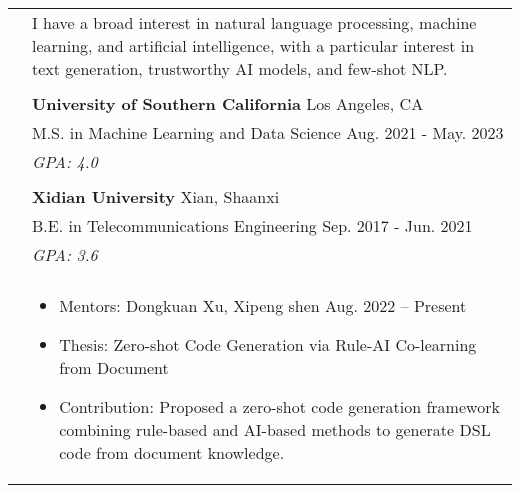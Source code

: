 \documentclass[letterpaper, 11pt]{article}
\begin{document}
\begin{longtable}{p{1.3in}p{4.8in}}



\nohyphens{\color{black}{Research interests}}
& I have a broad interest in natural language processing, machine learning, and artificial intelligence, with a particular interest in text generation, trustworthy AI models, and few-shot NLP. \\
& \\


\color{black}{Education} 

& \textbf{University of Southern California} \hfill Los Angeles, CA \\
& M.S. in Machine Learning and Data Science \hfill Aug. 2021 - May. 2023\\
& {\it GPA: 4.0}\\
& \\

& \textbf{Xidian University} \hfill Xian, Shaanxi\\
& B.E. in Telecommunications Engineering \hfill Sep. 2017 - Jun. 2021 \\
& {\it GPA: 3.6}\\
& \\





\nohyphens{\color{black}{Research experience}} 

&  \begin{itemize}[leftmargin=10pt, itemsep=-5pt, topsep=0pt,before=\textbf{North Carolina State University}]
    \item Mentors: Dongkuan Xu, Xipeng shen \hfill Aug. 2022 -- Present 
    \item Thesis: Zero-shot Code Generation via Rule-AI Co-learning from Document
    \item Contribution: Proposed a zero-shot code generation framework combining rule-based and AI-based methods to generate DSL code from document knowledge.
  \end{itemize}\\ 
  


\end{longtable}
\end{document}
